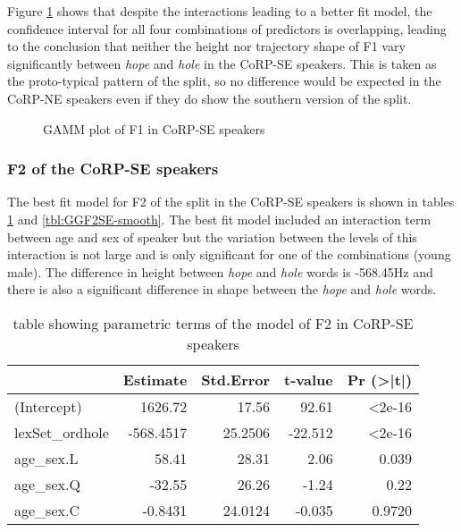 \documentclass[../../../00.FullDoc/tex/Thesis]{subfiles}
\begin{document}
Figure \ref{fig:GGF1SE} shows that despite the interactions leading to a better fit model, the confidence interval for all four combinations of predictors is overlapping, leading to the conclusion that neither the height nor trajectory shape of F1 vary significantly between \textit{hope} and \textit{hole} in the CoRP-SE speakers. This is taken as the proto-typical pattern of the \GG{} split, so no difference would be expected in the CoRP-NE speakers even if they do show the southern version of the split.

\begin{figure}[h]
	
	\caption{GAMM plot of F1 in CoRP-SE speakers} \label{fig:GGF1SE}
\end{figure}

\subsubsection{F2 of the CoRP-SE speakers}
The best fit model for F2 of the \GG{} split in the CoRP-SE speakers is shown in tables \ref{tbl:GGF2SE-para} and \ref{tbl:GGF2SE-smooth}. The best fit model included an interaction term between age and sex of speaker but the variation between the levels of this interaction is not large and is only significant for one of the combinations (young male). The difference in height between \textit{hope} and \textit{hole} words is -568.45Hz and there is also a significant difference in shape between the \textit{hope} and \textit{hole} words. 

\begin{table}[htbp]
	\centering
	\begin{tabular}{lrrrr}
		\hline
		& Estimate & Std.Error & t-value & Pr (>|t|) \\
		\hline
		(Intercept) & 1626.72 & 17.56 & 92.61 & <2e-16 \\
		lexSet\_ordhole & -568.4517 & 25.2506 & -22.512 & <2e-16 \\
		age\_sex.L & 58.41 & 28.31 & 2.06 & 0.039 \\
		age\_sex.Q & -32.55 & 26.26 & -1.24 & 0.22 \\
		age\_sex.C & -0.8431 & 24.0124 & -0.035 & 0.9720 \\		
		\hline
	\end{tabular}%
	\caption{table showing parametric terms of the model of F2 in CoRP-SE speakers}
	\label{tbl:GGF2SE-para}%
\end{table}%
\end{document}
